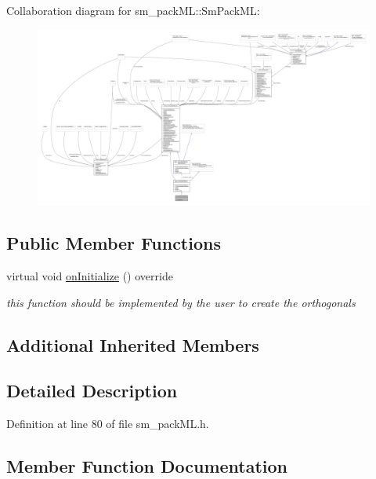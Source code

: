 Collaboration diagram for sm\+\_\+pack\+ML\+:\+:Sm\+Pack\+ML\+:
\nopagebreak
\begin{figure}[H]
\begin{center}
\leavevmode
\includegraphics[width=350pt]{structsm__packML_1_1SmPackML__coll__graph}
\end{center}
\end{figure}
\subsection*{Public Member Functions}
\begin{DoxyCompactItemize}
\item 
virtual void \hyperlink{structsm__packML_1_1SmPackML_a63aa0e31bcdf6c9584011d14bc6ec8af}{on\+Initialize} () override
\begin{DoxyCompactList}\small\item\em this function should be implemented by the user to create the orthogonals \end{DoxyCompactList}\end{DoxyCompactItemize}
\subsection*{Additional Inherited Members}


\subsection{Detailed Description}


Definition at line 80 of file sm\+\_\+pack\+M\+L.\+h.



\subsection{Member Function Documentation}
